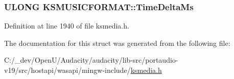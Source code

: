 \subsubsection[{\texorpdfstring{Time\+Delta\+Ms}{TimeDeltaMs}}]{\setlength{\rightskip}{0pt plus 5cm}U\+L\+O\+NG K\+S\+M\+U\+S\+I\+C\+F\+O\+R\+M\+A\+T\+::\+Time\+Delta\+Ms}\hypertarget{struct_k_s_m_u_s_i_c_f_o_r_m_a_t_a101e54dc49512fc63b7a8be95861357f}{}\label{struct_k_s_m_u_s_i_c_f_o_r_m_a_t_a101e54dc49512fc63b7a8be95861357f}


Definition at line 1940 of file ksmedia.\+h.



The documentation for this struct was generated from the following file\+:\begin{DoxyCompactItemize}
\item 
C\+:/\+\_\+dev/\+Open\+U/\+Audacity/audacity/lib-\/src/portaudio-\/v19/src/hostapi/wasapi/mingw-\/include/\hyperlink{ksmedia_8h}{ksmedia.\+h}\end{DoxyCompactItemize}
